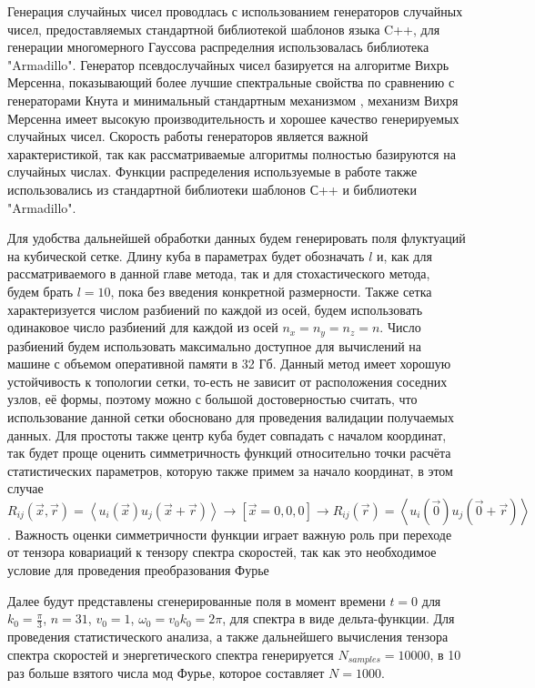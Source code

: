 Генерация случайных чисел проводлась с использованием генераторов случайных чисел, предоставляемых стандартной библиотекой шаблонов языка C++, для генерации многомерного Гауссова распределния использовалась библиотека "Armadillo". Генератор псевдослучайных чисел базируется на алгоритме Вихрь Мерсенна, показывающий более лучшие спектральные свойства по сравнению с генераторами Кнута и минимальный стандартным механизмом \cite{l2002object}, механизм Вихря Мерсенна имеет высокую производительность и хорошее качество генерируемых случайных чисел. Скорость работы генераторов является важной характеристикой, так как рассматриваемые алгоритмы полностью базируются на случайных числах. Функции распределения используемые в работе также использовались из стандартной библиотеки шаблонов С++ и библиотеки "Armadillo". 

Для удобства дальнейшей обработки данных будем генерировать поля флуктуаций на кубической сетке. Длину куба в параметрах будет обозначать $l$ и, как для рассматриваемого в данной главе метода, так и для стохастического метода, будем брать $l = 10$, пока без введения конкретной размерности. Также сетка характеризуется числом разбиений по каждой из осей, будем использовать одинаковое число разбиений для каждой из осей $n_x = n_y = n_z = n$. Число разбиений будем использовать максимально доступное для вычислений на машине с объемом оперативной памяти в 32 Гб. Данный метод имеет хорошую устойчивость к топологии сетки, то-есть не зависит от расположения соседних узлов, её формы, поэтому можно с большой достоверностью считать, что использование данной сетки обосновано для проведения валидации получаемых данных. Для простоты также центр куба будет совпадать с началом координат, так будет проще оценить симметричность функций относительно точки расчёта статистических параметров, которую также примем за начало координат, в этом случае $R_{ij}(\vec x, \vec r) = \left< u_i(\vec x) u_j(\vec x + \vec r) \right> \rightarrow \left[ \vec x = {0, 0, 0} \right] \rightarrow R_{ij}(\vec r) = \left< u_i(\vec 0) u_j(\vec 0 + \vec r) \right>$. Важность оценки симметричности функции играет важную роль при переходе от тензора ковариаций к тензору спектра скоростей, так как это необходимое условие для проведения преобразования Фурье

Далее будут представлены сгенерированные поля в момент времени $t = 0$ для $k_0 = \frac{\pi}{3}$, $n = 31$, $v_0 = 1$, $\omega_0 = v_0 k_0 = 2 \pi$, для спектра в виде дельта-функции. Для проведения статистического анализа, а также дальнейшего вычисления тензора спектра скоростей и энергетического спектра генерируется $N_{samples} = 10000$, в 10 раз больше взятого числа мод Фурье, которое составляет $N = 1000$. 

